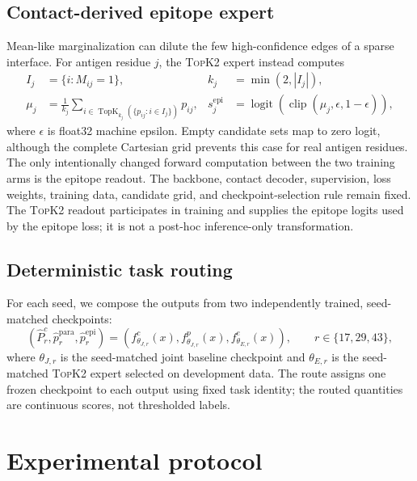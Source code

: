 \documentclass[10pt]{article}
\newcommand{\topktwo}{\textsc{TopK2}}
\begin{document}
\subsection{Contact-derived epitope expert}

Mean-like marginalization can dilute the few high-confidence edges of a sparse
interface. For antigen residue $j$, the \topktwo{} expert instead computes
\begin{equation}
 \begin{aligned}
 I_j&=\{i:M_{ij}=1\}, & k_j&=\min(2,|I_j|),\\
 \mu_j&=\frac1{k_j}\!\sum_{i\in
 \operatorname{TopK}_{k_j}(\{p_{ij}:i\in I_j\})}p_{ij},
 &s_j^{\mathrm{epi}}&=\operatorname{logit}\!\left(
 \operatorname{clip}(\mu_j,\epsilon,1-\epsilon)\right),
 \end{aligned}
 \label{eq:topk}
\end{equation}
where $\epsilon$ is float32 machine epsilon. Empty candidate sets map to zero
logit, although the complete Cartesian grid prevents this case for real antigen
residues. The only intentionally changed forward computation between the two
training arms is the epitope readout. The backbone, contact decoder,
supervision, loss weights, training data, candidate grid, and
checkpoint-selection rule remain fixed. The \topktwo{} readout participates in
training and supplies the epitope logits used by the epitope loss; it is not a
post-hoc inference-only transformation.

\subsection{Deterministic task routing}

For each seed, we compose the outputs from two independently trained,
seed-matched checkpoints:
\begin{equation}
 \left(\hat P_r^{c},\hat p_r^{\mathrm{para}},\hat p_r^{\mathrm{epi}}\right)=
 \left(f_{\theta_{J,r}}^{c}(x),f_{\theta_{J,r}}^{p}(x),
 f_{\theta_{E,r}}^{e}(x)\right), \qquad r\in\{17,29,43\},
\end{equation}
where $\theta_{J,r}$ is the seed-matched joint baseline checkpoint and
$\theta_{E,r}$ is the seed-matched \topktwo{} expert selected on development
data. The route assigns one frozen checkpoint to each output using fixed task
identity; the routed quantities are continuous scores, not thresholded labels.

\section{Experimental protocol}
\end{document}

